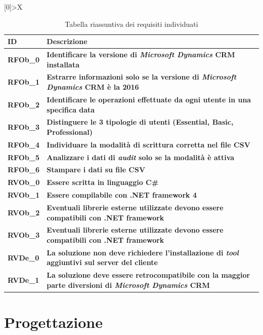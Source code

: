 \begin{table}[H]
\newcolumntype{Z}[0]{>{\centering\arraybackslash}X}
\begin{tabularx}{\textwidth}{|Z|X|}
	\hline
	\textbf{ID} & \textbf{Descrizione} \\\hline
	\textbf{RFOb\_0} & \textbf{Identificare la versione di \emph{Microsoft Dynamics} CRM installata} \\
    \hline
    	\textbf{RFOb\_1} & \textbf{Estrarre informazioni solo se la versione di \emph{Microsoft Dynamics} CRM è la 2016} \\
    \hline
    	\textbf{RFOb\_2} & \textbf{Identificare le operazioni effettuate da ogni utente in una specifica data} \\
    \hline
    	\textbf{RFOb\_3} & \textbf{Distinguere le 3 tipologie di utenti (Essential, Basic, Professional)} \\
    \hline
    	\textbf{RFOb\_4} & \textbf{Individuare la modalità di scrittura corretta nel file CSV} \\
    \hline
    	\textbf{RFOb\_5} & \textbf{Analizzare i dati di \emph{audit} solo se la modalità è attiva} \\
    \hline
        	\textbf{RFOb\_6} & \textbf{Stampare i dati su file CSV} \\
    \hline
        	\textbf{RVOb\_0} & \textbf{Essere scritta in linguaggio C\#} \\
        	\hline
	    \textbf{RVOb\_1} & \textbf{Essere compilabile con .NET framework 4} \\
    \hline
	    \textbf{RVOb\_2} & \textbf{Eventuali librerie esterne utilizzate devono essere compatibili con .NET framework} \\
    \hline
    \textbf{RVOb\_3} & \textbf{Eventuali librerie esterne utilizzate devono essere compatibili con .NET framework} \\
    \hline   
    \textbf{RVDe\_0} & \textbf{La soluzione non deve richiedere l’installazione di \emph{tool} aggiuntivi sul server del cliente} \\
    \hline 
    \textbf{RVDe\_1} & \textbf{La soluzione deve essere retrocompatibile con la maggior parte diversioni di \emph{Microsoft Dynamics} CRM} \\
    \hline 
\end{tabularx}
    \caption {Tabella riassuntiva dei requisiti individuati \label{fig:requisiti}}	
\end{table}

\section{Progettazione}

